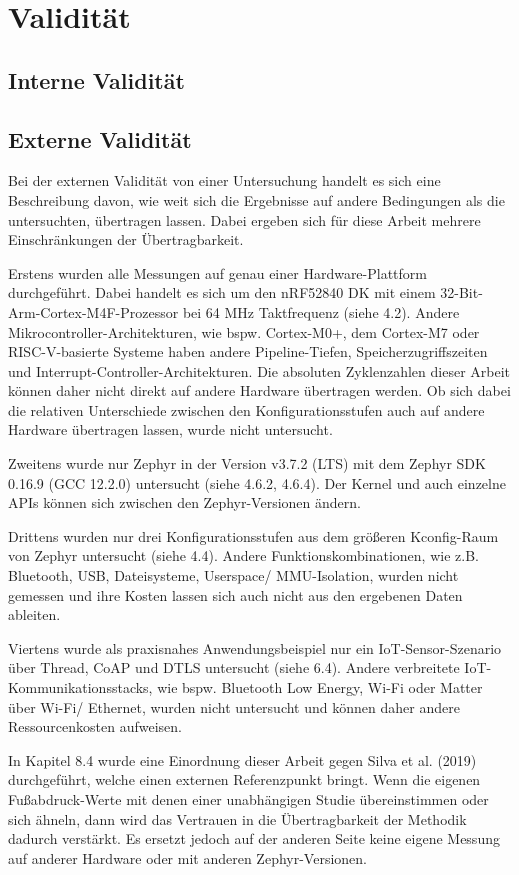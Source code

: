 \chapter{Validität}

\section{Interne Validität  }

\section{Externe Validität  }
Bei der externen Validität von einer Untersuchung handelt es sich eine Beschreibung davon, wie weit sich die Ergebnisse auf andere Bedingungen als die untersuchten, übertragen lassen. Dabei ergeben sich für diese Arbeit mehrere Einschränkungen der Übertragbarkeit.

Erstens wurden alle Messungen auf genau einer Hardware-Plattform durchgeführt. Dabei handelt es sich um den nRF52840 DK mit einem 32-Bit-Arm-Cortex-M4F-Prozessor bei 64 MHz Taktfrequenz (siehe 4.2). Andere Mikrocontroller-Architekturen, wie bspw. Cortex-M0+, dem Cortex-M7 oder RISC-V-basierte Systeme haben andere Pipeline-Tiefen, Speicherzugriffszeiten und Interrupt-Controller-Architekturen. Die absoluten Zyklenzahlen dieser Arbeit können daher nicht direkt auf andere Hardware übertragen werden. Ob sich dabei die relativen Unterschiede zwischen den Konfigurationsstufen auch auf andere Hardware übertragen lassen, wurde nicht untersucht.

Zweitens wurde nur Zephyr in der Version v3.7.2 (LTS) mit dem Zephyr SDK 0.16.9 (GCC 12.2.0) untersucht (siehe 4.6.2, 4.6.4). Der Kernel und auch einzelne APIs können sich zwischen den Zephyr-Versionen ändern.

Drittens wurden nur drei Konfigurationsstufen aus dem größeren Kconfig-Raum von Zephyr untersucht (siehe 4.4). Andere Funktionskombinationen, wie z.B. Bluetooth, USB, Dateisysteme, Userspace/ MMU-Isolation, wurden nicht gemessen und ihre Kosten lassen sich auch nicht aus den ergebenen Daten ableiten.

Viertens wurde als praxisnahes Anwendungsbeispiel nur ein IoT-Sensor-Szenario über Thread, CoAP und DTLS untersucht (siehe 6.4). Andere verbreitete IoT-Kommunikationsstacks, wie bspw. Bluetooth Low Energy, Wi-Fi oder Matter über Wi-Fi/ Ethernet, wurden nicht untersucht und können daher andere Ressourcenkosten aufweisen.

In Kapitel 8.4 wurde eine Einordnung dieser Arbeit gegen Silva et al. (2019) durchgeführt, welche einen externen Referenzpunkt bringt. Wenn die eigenen Fußabdruck-Werte mit denen einer unabhängigen Studie übereinstimmen oder sich ähneln, dann wird das Vertrauen in die Übertragbarkeit der Methodik dadurch verstärkt. Es ersetzt jedoch auf der anderen Seite keine eigene Messung auf anderer Hardware oder mit anderen Zephyr-Versionen.

